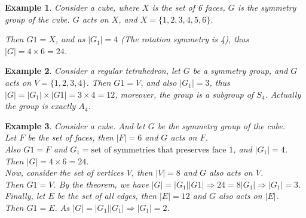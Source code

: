 \documentclass{article}
\theoremstyle{MyNonumberplain}
\theoremstyle{break}
\theoremstyle{break}
\newtheorem{example}{Example}[section]
\theoremstyle{break}
\theoremstyle{definition}
\theoremstyle{break}
\begin{document}
\begin{expbox}
    \begin{example}
        Consider a cube, where $X$ is the set of 6 faces, $G$ is the symmetry group of
the cube. $G$ acts on $X$, and $X = \{ 1, 2, 3, 4, 5, 6 \}$.

Then $G 1 = X$, and as $| G_1 | = 4$ (The rotation symmetry is 4), thus $| G |
= 4 \times 6 = 24$.
    \end{example}
\end{expbox}

\begin{expbox}
    \begin{example}
        Consider a regular tetrahedron, let $G$ be a symmetry group, and $G$ acts on
$V = \{ 1, 2, 3, 4 \}$. Then $G 1 = V$, and also $| G_1 | = 3$, thus $| G | =
| G_1 | \times | G 1 | = 3 \times 4 = 12$, moreover, the group is a subgroup
of $S_4$. Actually the group is exactly $A_4$.
    \end{example}
\end{expbox}

\begin{expbox}
    \begin{example}
        Consider a cube. And let $G$ be the symmetry group of the cube.\\

        Let $F$ be the set of faces, then $| F | = 6$ and $G$ acts on $F$.\\

        Also $G 1 = F$ and $G_1 = \text{set of symmetries that preserves face 1}$,
        and $| G_1 | = 4$.\\

        Then $| G | = 4 \times 6 = 24$.\\

        Now, consider the set of vertices $V$, then $| V | = 8$ and $G$ also acts on
        $V$.\\

        Then $G 1 = V$. By the theorem, we have $| G | = | G_1 |  | G 1 | \Rightarrow
        24 = 8 | G_1 | \Rightarrow | G_1 | = 3$.\\

        Finally, let $E$ be the set of all edges, then $| E | = 12$ and $G$ also acts
        on $| E |$.\\

        Then $G 1 = E$. As $| G | = | G_1 |  | G_1 | \Rightarrow | G_1 | = 2$.
    \end{example}
\end{expbox}
\end{document}

